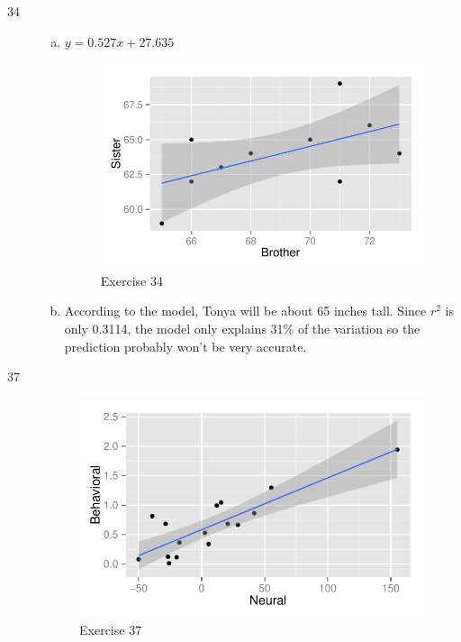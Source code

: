 \documentclass[letterpaper, landscape]{exam}
\begin{document}
\begin{description}
      \item[34]
        \begin{enumerate}[(a)]
          \item 
            $y = 0.527x + 27.635$
            \begin{figure}[H]
              \centering
              \includegraphics[scale = 0.9]{figures/ex34.pdf}
              \caption{Exercise 34}
            \end{figure}

          \item
            According to the model, Tonya will be about 65 inches tall.  Since
            $r^2$ is only 0.3114, the model only explains 31\% of the variation
            so the prediction probably won't be very accurate.
        \end{enumerate}

      \item[37]
        \begin{figure}[ht]
          \centering
          \includegraphics[scale = 0.9]{figures/ex37.pdf}
          \caption{Exercise 37}\label{fig:37}
        \end{figure}


\end{description}
\end{document}
